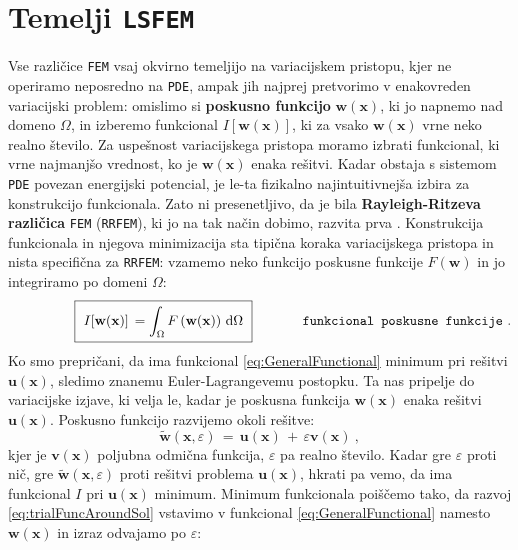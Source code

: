 \section{Temelji \texttt{LSFEM}}

Vse različice \texttt{FEM} vsaj okvirno temeljijo na variacijskem pristopu, kjer ne operiramo neposredno na \texttt{PDE}, ampak jih najprej pretvorimo v enakovreden variacijski problem: omislimo si \textbf{poskusno funkcijo} $\mathbf{w}(\mathbf{x})$, ki jo napnemo nad domeno $\Omega$, in izberemo funkcional $I[\mathbf{w}(\mathbf{x})]$, ki za vsako $\mathbf{w}(\mathbf{x})$ vrne neko realno število. Za uspešnost variacijskega pristopa moramo izbrati funkcional, ki vrne najmanjšo vrednost, ko je $\mathbf{w}(\mathbf{x})$ enaka rešitvi. Kadar obstaja s sistemom \texttt{PDE} povezan energijski potencial, je le-ta fizikalno najintuitivnejša izbira za konstrukcijo funkcionala. Zato ni presenetljivo, da je bila \textbf{Rayleigh-Ritzeva različica} \texttt{FEM} (\texttt{RRFEM}), ki jo na tak način dobimo, razvita prva \cite{RitzW-Variationsprobleme}. Konstrukcija funkcionala in njegova minimizacija sta tipična koraka variacijskega pristopa in nista specifična za \texttt{RRFEM}: vzamemo neko funkcijo poskusne funkcije $F\left(\mathbf{w}\right)$ in jo integriramo po domeni $\Omega$:
\vspace{-1mm}
\begin{equation}
	\hspace{17mm} \boxed{
		\vphantom{\bigg(} \ I[\mathbf{w(x)}] \, = \int_{\Omega} F\left(\mathbf{w(x)}\right) \, \ud \Omega \ } \hspace{13mm} \texttt{funkcional poskusne funkcije} \ .
	\label{eq:GeneralFunctional}
\end{equation}
Ko smo prepričani, da ima funkcional \eqref{eq:GeneralFunctional} minimum pri rešitvi $\mathbf{u}(\mathbf{x})$, sledimo znanemu Euler-Lagrange\-ve\-mu postopku. Ta nas pripelje do variacijske izjave, ki velja le, kadar je poskusna funkcija $\mathbf{w}(\mathbf{x})$ enaka rešitvi $\mathbf{u}(\mathbf{x})$. Poskusno funkcijo razvijemo okoli rešitve:
\begin{equation}
	\widetilde{\mathbf{w}}(\mathbf{x}, \varepsilon) \, = \, \mathbf{u}(\mathbf{x}) \, + \, \varepsilon \mathbf{v}(\mathbf{x}) \ ,
	\label{eq:trialFuncAroundSol}
\end{equation}
kjer je $\mathbf{v}(\mathbf{x})$ poljubna odmična funkcija, $\varepsilon$ pa realno število. Kadar gre $\varepsilon$ proti nič, gre $\widetilde{\mathbf{w}}(\mathbf{x}, \varepsilon)$ proti rešitvi problema $\mathbf{u}(\mathbf{x})$, hkrati pa vemo, da ima funkcional $I$ pri $\mathbf{u}(\mathbf{x})$ minimum. Minimum funkcionala poiščemo tako, da razvoj \eqref{eq:trialFuncAroundSol} vstavimo v funkcional \eqref{eq:GeneralFunctional} namesto $\mathbf{w}(\mathbf{x})$ in izraz odvajamo po $\varepsilon$:
